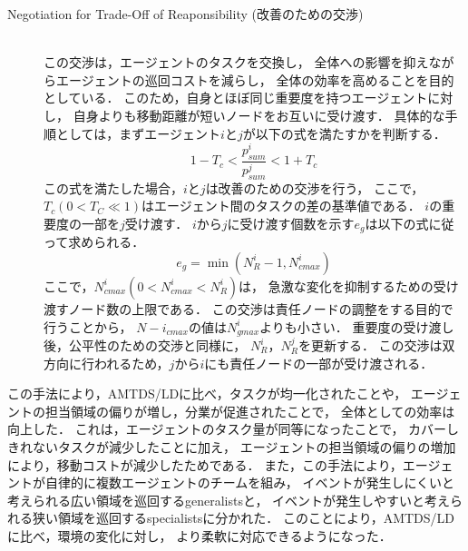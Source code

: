 \documentclass[12pt,a4j,twoside]{jarticle}
\begin{document}
\begin{description}
    \item[Negotiation for Trade-Off of Reaponsibility (改善のための交渉)]\mbox{}\\
      この交渉は，エージェントのタスクを交換し，
      全体への影響を抑えながらエージェントの巡回コストを減らし，
      全体の効率を高めることを目的としている．
      このため，自身とほぼ同じ重要度を持つエージェントに対し，
      自身よりも移動距離が短いノードをお互いに受け渡す．
      具体的な手順としては，まずエージェント$i$と$j$が以下の式を満たすかを判断する．
      \begin{equation}
        1 - T_c < \dfrac{p^i_{sum}}{p^j_{sum}} < 1 + T_c
      \end{equation}
      この式を満たした場合，$i$と$j$は改善のための交渉を行う，
      ここで，$T_c(0 < T_C \ll 1)$はエージェント間のタスクの差の基準値である．
      $i$の重要度の一部を$j$受け渡す．
      $i$から$j$に受け渡す個数を示す$e_g$は以下の式に従って求められる．
      \begin{equation}
        e_g = \min(N^i_R-1, N^i_{cmax})
      \end{equation}
      ここで，$N^i_{cmax}(0 < N^i_{cmax} < N^i_R)$は，
      急激な変化を抑制するための受け渡すノード数の上限である．
      この交渉は責任ノードの調整をする目的で行うことから，
      $N-i_{cmax}$の値は$N^i_{gmax}$よりも小さい．
      重要度の受け渡し後，公平性のための交渉と同様に，
      $N^i_R$，$N^j_R$を更新する．
      この交渉は双方向に行われるため，$j$から$i$にも責任ノードの一部が受け渡される．

  \end{description}
  この手法により，AMTDS/LDに比べ，タスクが均一化されたことや，
  エージェントの担当領域の偏りが増し，分業が促進されたことで，
  全体としての効率は向上した．
  これは，エージェントのタスク量が同等になったことで，
  カバーしきれないタスクが減少したことに加え，
  エージェントの担当領域の偏りの増加により，移動コストが減少したためである．
  また，この手法により，エージェントが自律的に複数エージェントのチームを組み，
  イベントが発生しにくいと考えられる広い領域を巡回するgeneralistsと，
  イベントが発生しやすいと考えられる狭い領域を巡回するspecialistsに分かれた．
  このことにより，AMTDS/LDに比べ，環境の変化に対し，
  より柔軟に対応できるようになった．
\end{document}
